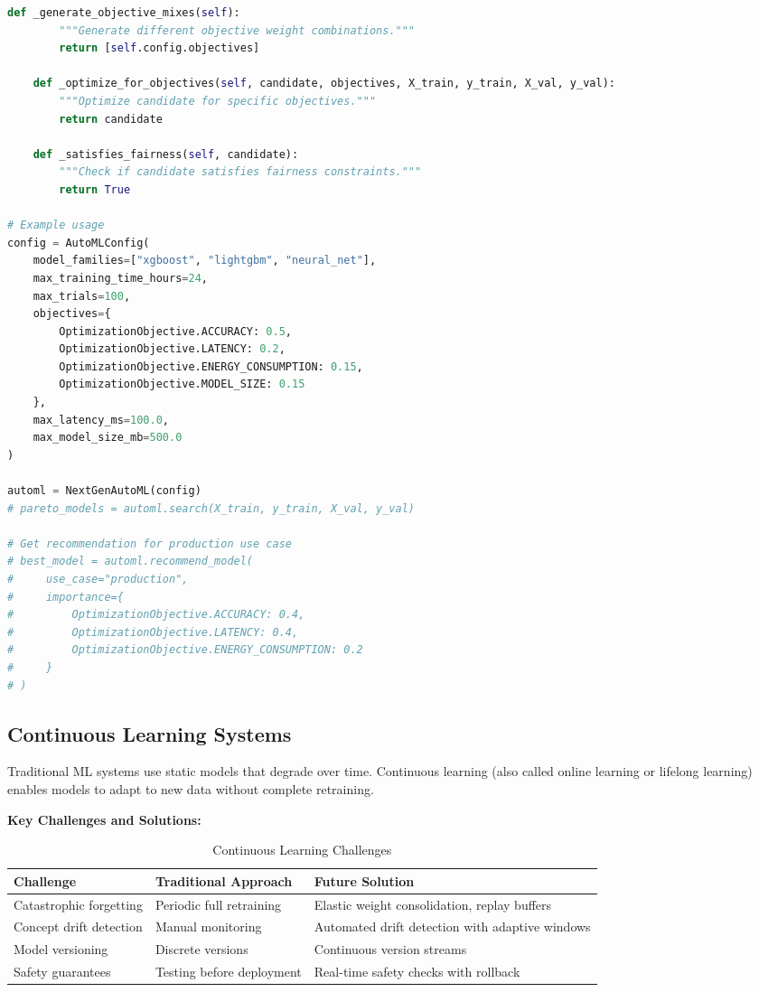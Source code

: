 \begin{lstlisting}[language=Python, caption=Next-Generation AutoML Framework]
    def _generate_objective_mixes(self):
        """Generate different objective weight combinations."""
        return [self.config.objectives]

    def _optimize_for_objectives(self, candidate, objectives, X_train, y_train, X_val, y_val):
        """Optimize candidate for specific objectives."""
        return candidate

    def _satisfies_fairness(self, candidate):
        """Check if candidate satisfies fairness constraints."""
        return True

# Example usage
config = AutoMLConfig(
    model_families=["xgboost", "lightgbm", "neural_net"],
    max_training_time_hours=24,
    max_trials=100,
    objectives={
        OptimizationObjective.ACCURACY: 0.5,
        OptimizationObjective.LATENCY: 0.2,
        OptimizationObjective.ENERGY_CONSUMPTION: 0.15,
        OptimizationObjective.MODEL_SIZE: 0.15
    },
    max_latency_ms=100.0,
    max_model_size_mb=500.0
)

automl = NextGenAutoML(config)
# pareto_models = automl.search(X_train, y_train, X_val, y_val)

# Get recommendation for production use case
# best_model = automl.recommend_model(
#     use_case="production",
#     importance={
#         OptimizationObjective.ACCURACY: 0.4,
#         OptimizationObjective.LATENCY: 0.4,
#         OptimizationObjective.ENERGY_CONSUMPTION: 0.2
#     }
# )
\end{lstlisting}

\subsection{Continuous Learning Systems}

Traditional ML systems use static models that degrade over time. Continuous learning (also called online learning or lifelong learning) enables models to adapt to new data without complete retraining.

\textbf{Key Challenges and Solutions:}

\begin{table}[h]
\centering
\caption{Continuous Learning Challenges}
\begin{tabular}{p{3.5cm}p{4.5cm}p{4.5cm}}
\toprule
\textbf{Challenge} & \textbf{Traditional Approach} & \textbf{Future Solution} \\
\midrule
Catastrophic forgetting & Periodic full retraining & Elastic weight consolidation, replay buffers \\
\midrule
Concept drift detection & Manual monitoring & Automated drift detection with adaptive windows \\
\midrule
Model versioning & Discrete versions & Continuous version streams \\
\midrule
Safety guarantees & Testing before deployment & Real-time safety checks with rollback \\
\bottomrule
\end{tabular}
\end{table}


